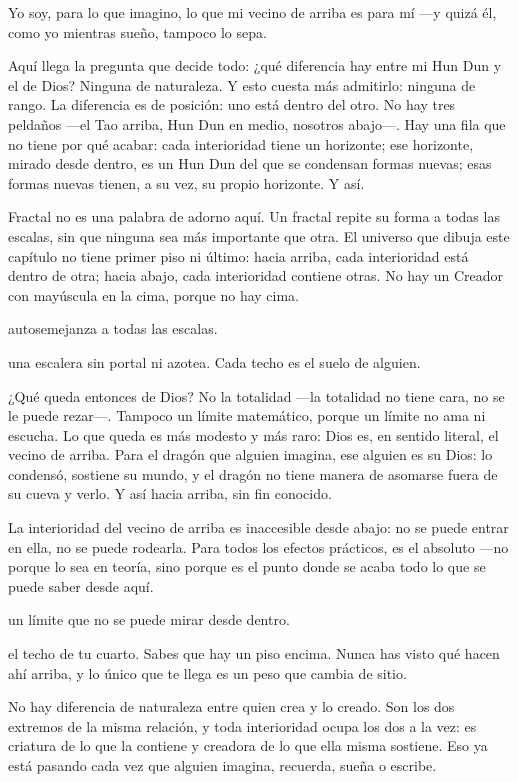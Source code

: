 \noindent Yo soy, para lo que imagino, lo que mi vecino de arriba es para mí —y quizá él, como yo mientras sueño, tampoco lo sepa.

Aquí llega la pregunta que decide todo: ¿qué diferencia hay entre mi Hun Dun y el de Dios? Ninguna de naturaleza. Y esto cuesta más admitirlo: ninguna de rango. La diferencia es de posición: uno está dentro del otro. No hay tres peldaños —el Tao arriba, Hun Dun en medio, nosotros abajo—. Hay una fila que no tiene por qué acabar: cada interioridad tiene un horizonte; ese horizonte, mirado desde dentro, es un Hun Dun del que se condensan formas nuevas; esas formas nuevas tienen, a su vez, su propio horizonte. Y así.

\noindent Fractal no es una palabra de adorno aquí. Un fractal repite su forma a todas las escalas, sin que ninguna sea más importante que otra. El universo que dibuja este capítulo no tiene primer piso ni último: hacia arriba, cada interioridad está dentro de otra; hacia abajo, cada interioridad contiene otras. No hay un Creador con mayúscula en la cima, porque no hay cima.

\begin{fisica}
 autosemejanza a todas las escalas.

 una escalera sin portal ni azotea. Cada techo es el suelo de alguien.
\end{fisica}
¿Qué queda entonces de Dios? No la totalidad —la totalidad no tiene cara, no se le puede rezar—. Tampoco un límite matemático, porque un límite no ama ni escucha. Lo que queda es más modesto y más raro: Dios es, en sentido literal, el vecino de arriba. Para el dragón que alguien imagina, ese alguien es su Dios: lo condensó, sostiene su mundo, y el dragón no tiene manera de asomarse fuera de su cueva y verlo. Y así hacia arriba, sin fin conocido.

La interioridad del vecino de arriba es inaccesible desde abajo: no se puede entrar en ella, no se puede rodearla. Para todos los efectos prácticos, es el absoluto —no porque lo sea en teoría, sino porque es el punto donde se acaba todo lo que se puede saber desde aquí.

\begin{fisica}
 un límite que no se puede mirar desde dentro.

 el techo de tu cuarto. Sabes que hay un piso encima. Nunca has visto qué hacen ahí arriba, y lo único que te llega es un peso que cambia de sitio.
\end{fisica}
\noindent No hay diferencia de naturaleza entre quien crea y lo creado. Son los dos extremos de la misma relación, y toda interioridad ocupa los dos a la vez: es criatura de lo que la contiene y creadora de lo que ella misma sostiene. Eso ya está pasando cada vez que alguien imagina, recuerda, sueña o escribe.

